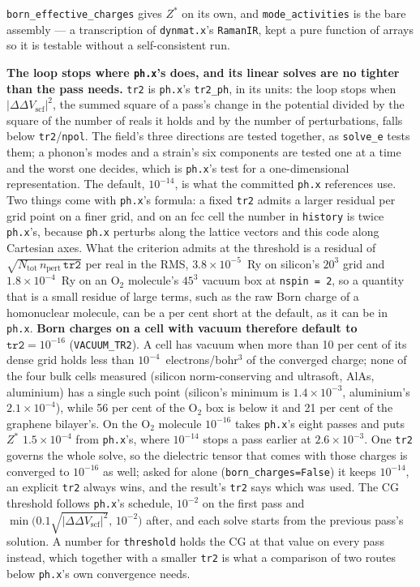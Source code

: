 \documentclass[11pt,a4paper]{article}
\newcommand{\code}[1]{\texttt{\small #1}}
\begin{document}
\code{born\_effective\_charges} gives $Z^{\ast}$ on its own, and
\code{mode\_activities} is the bare assembly --- a transcription of
\code{dynmat.x}'s \code{RamanIR}, kept a pure function of arrays so it is
testable without a self-consistent run.

\textbf{The loop stops where \code{ph.x}'s does, and its linear solves are no
tighter than the pass needs.} \code{tr2} is \code{ph.x}'s \code{tr2\_ph}, in its
units: the loop stops when $|\Delta\Delta V_{\mathrm{scf}}|^2$, the summed square
of a pass's change in the potential divided by the square of the number of reals
it holds and by the number of perturbations, falls below \code{tr2}/\code{npol}.
The field's three directions are tested together, as \code{solve\_e} tests them;
a phonon's modes and a strain's six components are tested one at a time and the
worst one decides, which is \code{ph.x}'s test for a one-dimensional
representation. The default, $10^{-14}$, is what the committed \code{ph.x}
references use. Two things come with \code{ph.x}'s formula: a fixed \code{tr2}
admits a larger residual per grid point on a finer grid, and on an fcc cell the
number in \code{history} is twice \code{ph.x}'s, because \code{ph.x} perturbs
along the lattice vectors and this code along Cartesian axes. What the criterion
admits at the threshold is a residual of $\sqrt{N_{\mathrm{tot}}\,n_{\mathrm{pert}}\,
\mathtt{tr2}}$ per real in the RMS, $3.8\times10^{-5}$~Ry on silicon's $20^3$ grid
and $1.8\times10^{-4}$~Ry on an O$_2$ molecule's $45^3$ vacuum box at
\code{nspin = 2}, so a quantity that is a small residue of large terms, such as
the raw Born charge of a homonuclear molecule, can be a per cent short at the
default, as it can be in \code{ph.x}. \textbf{Born charges on a cell with vacuum
therefore default to $\mathtt{tr2}=10^{-16}$} (\code{VACUUM\_TR2}). A cell has
vacuum when more than 10 per cent of its dense grid holds less than
$10^{-4}$~electrons/bohr$^3$ of the converged charge; none of the four bulk cells
measured (silicon norm-conserving and ultrasoft, AlAs, aluminium) has a single such
point (silicon's minimum is $1.4\times10^{-3}$, aluminium's
$2.1\times10^{-4}$), while 56 per cent of the O$_2$ box is below it and 21 per cent of
the graphene bilayer's. On the O$_2$ molecule $10^{-16}$ takes \code{ph.x}'s eight
passes and puts $Z^{\ast}$ $1.5\times10^{-4}$ from \code{ph.x}'s, where $10^{-14}$
stops a pass earlier at $2.6\times10^{-3}$. One \code{tr2} governs the whole solve,
so the dielectric tensor that comes with those charges is converged to $10^{-16}$
as well; asked for alone (\code{born\_charges=False}) it keeps $10^{-14}$, an
explicit \code{tr2} always wins, and the result's \code{tr2} says which was used.
The CG threshold
follows \code{ph.x}'s schedule, $10^{-2}$ on the first pass and
$\min\big(0.1\sqrt{|\Delta\Delta V_{\mathrm{scf}}|^2},\,10^{-2}\big)$ after, and
each solve starts from the previous pass's solution. A number for
\code{threshold} holds the CG at that value on every pass instead, which together
with a smaller \code{tr2} is what a comparison of two routes below \code{ph.x}'s
own convergence needs.
\end{document}
